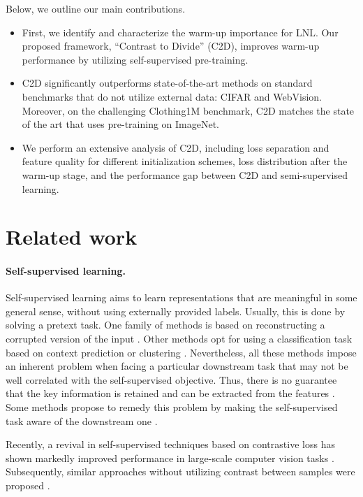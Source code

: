 \documentclass[10pt,twocolumn,letterpaper]{article}
\renewcommand{\cite}[1]{\citep{#1}}
\begin{document}
Below, we outline our main contributions. 
\begin{itemize}
    \item First, we identify and characterize the warm-up importance for LNL. Our proposed framework, ``Contrast to Divide'' (C2D), improves warm-up performance by utilizing self-supervised pre-training.
    \item C2D significantly outperforms state-of-the-art methods on standard benchmarks that do not utilize external data: CIFAR and WebVision. 
    Moreover, on the challenging Clothing1M benchmark, C2D matches the state of the art that uses pre-training on ImageNet.
    \item We perform an extensive analysis of C2D, including loss separation and feature quality for different initialization schemes, loss distribution after the warm-up stage, and the performance gap between C2D and semi-supervised learning.
\end{itemize} 
\section{Related work}
\label{sec:related}

\paragraph{Self-supervised learning.}
Self-supervised learning aims to learn representations that are meaningful in some general sense, without using externally provided labels. Usually, this is done by solving a pretext task. One family of methods is based on reconstructing a corrupted version of the input  \cite{vincent2008extracting, zhang2016colorful,pathak2016context, zhang2017split}.
Other methods opt for using a classification task based on context prediction \cite{doersch2015unsupervised,noroozi2016unsupervised, gidaris2018unsupervised,kolesnikov2019revisiting} or clustering \cite{caron2018deep}. 
Nevertheless, all these methods impose an inherent problem when facing a particular downstream task that may not be well correlated with the self-supervised objective. Thus, there is no guarantee that the key information is retained and can be extracted from the features \cite{misra2020self}. Some methods  propose to remedy this problem by making the self-supervised task aware of the downstream one  \cite{zhai2019s4l,khosla2020supervised}. 

Recently, a revival in self-supervised techniques based on contrastive loss \cite{hadsell2006dimensionality} has shown markedly improved performance in large-scale computer vision tasks
\cite{henaff2019cpc2,chen2020simclr,tian2020infomin,xie2020pointcontrast}. Subsequently, similar approaches without utilizing contrast between samples were proposed \cite{grill2020bootstrap,chen2020simsiam,zbontar2021barlow}. 
\end{document}
